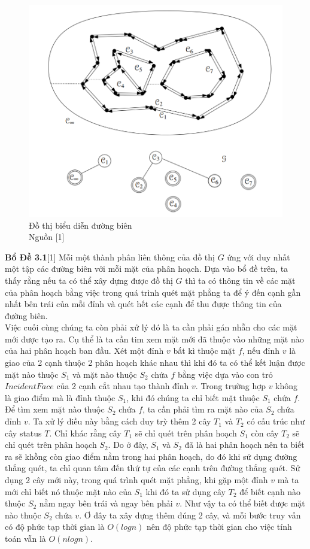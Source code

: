 \documentclass[15pt]{article}
\begin{document}
{\begin{figure}[h!]
\centering
\includegraphics[scale=0.5]{./face_graph.png}
\caption{Đồ thị biểu diễn đường biên \\ Nguồn [1]}
\label{fig: đồ thị}
\end{figure}
\textbf{Bổ Đề 3.1}[1] Mỗi một thành phân liên thông của đồ thị $G$ ứng với duy nhất một tập các đường biên với mỗi mặt của phân hoạch.
Dựa vào bổ đề trên, ta thấy rằng nếu ta có thể xây dựng được đồ thị $G$ thì ta có thông tin về các mặt của phân hoạch bằng việc trong quá trình quét mặt phẳng ta để ý đến cạnh gần nhất bên trái của mỗi đỉnh và quét hết các cạnh để thu được thông tin của đường biên. \\

Việc cuối cùng chúng ta còn phải xử lý đó là ta cần phải gán nhẵn cho các mặt mới được tạo ra. Cụ thể là ta cần tim xem mặt mới đã thuộc vào những mặt nào của hai phân hoạch ban đầu. Xét một đỉnh $v$ bất kì thuộc mặt $f$, nếu đỉnh $v$ là giao của 2 cạnh thuộc 2 phân hoạch khác nhau thì khi đó ta có thể kết luận được mặt nào thuộc $S_1$ và mặt nào thuộc $S_2$ chứa $f$ bằng việc dựa vào con trỏ $IncidentFace$ của 2 cạnh cắt nhau tạo thành đỉnh $v$. Trong trường hợp $v$ không là giao điểm mà là đỉnh thuộc $S_1$, khi đó chúng ta chỉ biết mặt thuộc $S_1$ chứa $f$. Để tìm xem mặt nào thuộc $S_2$ chứa $f$, ta cần phải tìm ra mặt nào của $S_2$ chứa đỉnh $v$. Ta xử lý điều này bằng cách duy trỳ thêm 2 cây $T_1$ và $T_2$ có cấu trúc như cây status $T$. Chỉ khác rằng cây $T_1$ sẽ chỉ quét trên phân hoạch $S_1$ còn cây $T_2$ sẽ chỉ quét trên phân hoạch $S_2$. Do ở đây, $S_1$ và $S_2$ đã là hai phân hoạch nên ta biết ra sẽ khồng còn giao điểm nằm trong hai phân hoạch, do đó khi sử dụng đường thẳng quét, ta chỉ quan tâm đến thứ tự của các cạnh trên đường thẳng quét. Sử dụng 2 cây mới này, trong quá trình quét mặt phẳng, khi gặp một đỉnh $v$ mà ta mới chỉ biết nó thuộc mặt nào của $S_1$ khi đó ta sử dụng cây $T_2$ để biết cạnh nào thuộc $S_2$ nằm ngay bên trái và ngay bên phải $v$. Như vậy ta có thể biết được mặt nào thuộc $S_2$ chứa $v$. Ơ đây ta xây dựng thêm đúng 2 cây, và mỗi bước truy vấn có độ phức tạp thời gian là $O(log n)$ nên độ phức tạp thời gian cho việc tính toán vẫn là $O(n log n)$. \\

}
\end{document}
